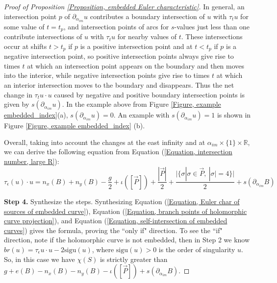 \documentclass{amsart}
\theoremstyle{definition}
\theoremstyle{remark}
\numberwithin{equation}{section}
\numberwithin{equation}{section} \makeatletter
\begin{document}
\begin{proof}[Proof of Proposition \ref{Proposition, embedded Euler characteristic}]
In general, an intersection point $p$ of $\partial_{\alpha_{im}} u$ contributes a boundary intersection of $u$ with $\tau_t u$ for some value of $t= t_p$, and intersection points of arcs for $s$-values just less than one contribute intersections of  $u$ with $\tau_t u$ for nearby values of $t$. These intersections occur at shifts $t > t_p$ if $p$ is a positive intersection point and at $t < t_p$ if $p$ is a negative intersection point, so positive intersection points always give rise to times $t$ at which an intersection point appears on the boundary and then moves into the interior, while negative intersection points give rise to times $t$ at which an interior intersection moves to the boundary and disappears. Thus the net change in $\tau_t u\cdot u$ caused by negative and positive boundary intersection points is given by $s(\partial_{\alpha_{im}}u)$. In the example above from Figure \ref{Figure, example embedded_index}(a), $s(\partial_{\alpha_{im}}u)=0$. An example with $s(\partial_{\alpha_{im}}u) = 1$ is shown in Figure \ref{Figure, example embedded_index} (b). 

Overall, taking into account the changes at the east infinity and at $\alpha_{im}\times\{1\}\times\mathbb{R}$, we can derive the following equation from Equation (\ref{Equation, intersection number, large R}):
\begin{equation}\label{Equation, self-intersection of embedded curves}
\tau_\epsilon(u)\cdot u=n_x(B)+n_y(B)-\frac{g}{2}+\iota([\overrightarrow{P}])+\frac{|\overrightarrow{P}|}{2}+\frac{\vert\{\sigma|{\sigma}\in \overrightarrow{P},\ |\sigma|=4\}\vert}{2}+s(\partial_{\alpha_{im}}B)
\end{equation}

\textbf{Step 4.} Synthesize the steps. Synthesizing Equation (\ref{Equation, Euler char of sources of embedded curve}), Equation (\ref{Equation, branch points of holomorphic curve projection}), and Equation (\ref{Equation, self-intersection of embedded curves}) gives the formula, proving the ``only if" direction. To see the ``if" direction, note if the holomorphic curve is not embedded, then in Step 2 we know $br(u)=\tau_{\epsilon}u\cdot u-2 \text{sigu}(u)$, where $\text{sigu}(u)>0$ is the order of singularity $u$. So, in this case we have $\chi(S)$ is strictly greater than $g+e(B)-n_x(B)-n_y(B)-\iota([\overrightarrow{P}])+s(\partial_{\alpha_{im}}B).$
\end{proof}
\end{document}
